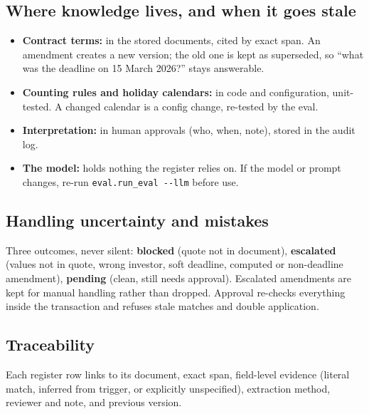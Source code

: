 \documentclass[10pt,a4paper]{article}
\newcommand{\code}[1]{\texttt{\small #1}}
\begin{document}
\begin{minipage}[t]{0.485\linewidth}
\subsection{Where knowledge lives, and when it goes stale}
\begin{itemize}
  \item \textbf{Contract terms:} in the stored documents, cited by exact span. An amendment creates a new version; the old one is kept as superseded, so ``what was the deadline on 15 March 2026?'' stays answerable.
  \item \textbf{Counting rules and holiday calendars:} in code and configuration, unit-tested. A changed calendar is a config change, re-tested by the eval.
  \item \textbf{Interpretation:} in human approvals (who, when, note), stored in the audit log.
  \item \textbf{The model:} holds nothing the register relies on. If the model or prompt changes, re-run \code{eval.run\_eval -{}-llm} before use.
\end{itemize}

\subsection{Handling uncertainty and mistakes}
Three outcomes, never silent: \textbf{blocked} (quote not in document), \textbf{escalated} (values not in quote, wrong investor, soft deadline, computed or non-deadline amendment), \textbf{pending} (clean, still needs approval). Escalated amendments are kept for manual handling rather than dropped. Approval re-checks everything inside the transaction and refuses stale matches and double application.

\subsection{Traceability}
Each register row links to its document, exact span, field-level evidence (literal match, inferred from trigger, or explicitly unspecified), extraction method, reviewer and note, and previous version.
\end{minipage}

\newpage
\end{document}
